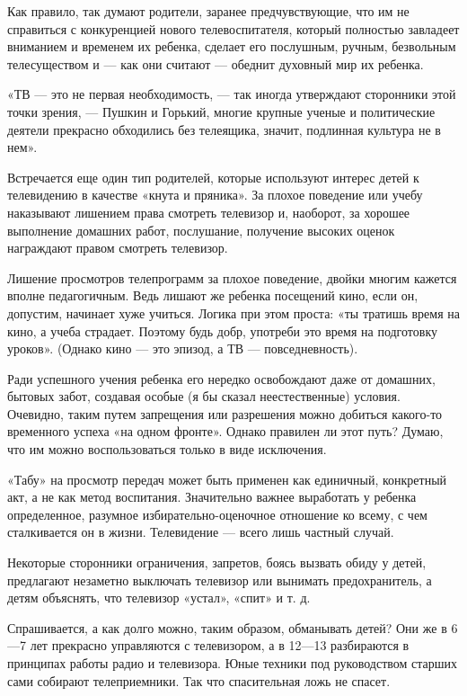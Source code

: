 \documentclass[12pt, a4paper, openany]{book}
\begin{document}
Как правило, так думают родители, заранее предчувствующие, что им не справиться с конкуренцией нового телевоспитателя, который полностью завладеет вниманием и временем их ребенка, сделает его послушным, ручным, безвольным телесуществом и — как они считают — обеднит духовный мир их ребенка. 

«ТВ — это не первая необходимость, — так иногда утверждают сторонники этой точки зрения, — Пушкин и Горький, многие крупные ученые и политические деятели прекрасно обходились без телеящика, значит, подлинная культура не в нем». 

Встречается еще один тип родителей, которые используют интерес детей к телевидению в качестве «кнута и пряника». За плохое поведение или учебу наказывают лишением права смотреть телевизор и, наоборот, за хорошее выполнение домашних работ, послушание, получение высоких оценок награждают правом смотреть телевизор. 

Лишение просмотров телепрограмм за плохое поведение, двойки многим кажется вполне педагогичным. Ведь лишают же ребенка посещений кино, если он, допустим, начинает хуже учиться. Логика при этом проста: «ты тратишь время на кино, а учеба страдает. Поэтому будь добр, употреби это время на подготовку уроков». (Однако кино — это эпизод, а ТВ — повседневность). 

Ради успешного учения ребенка его нередко освобождают даже от домашних, бытовых забот, создавая особые (я бы сказал неестественные) условия. Очевидно, таким путем запрещения или разрешения можно добиться какого-то временного успеха «на одном фронте». Однако правилен ли этот путь? Думаю, что им можно воспользоваться только в виде исключения. 

«Табу» на просмотр передач может быть применен как единичный, конкретный акт, а не как метод воспитания. Значительно важнее выработать у ребенка определенное, разумное избирательно-оценочное отношение ко всему, с чем сталкивается он в жизни. Телевидение — всего лишь частный случай. 

Некоторые сторонники ограничения, запретов, боясь вызвать обиду у детей, предлагают незаметно выключать телевизор или вынимать предохранитель, а детям объяснять, что телевизор «устал», «спит» и т. д. 

Спрашивается, а как долго можно, таким образом, обманывать детей? Они же в 6—7 лет прекрасно управляются с телевизором, а в 12—13 разбираются в принципах работы радио и телевизора. Юные техники под руководством старших сами собирают телеприемники. Так что спасительная ложь не спасет. 
\end{document}
